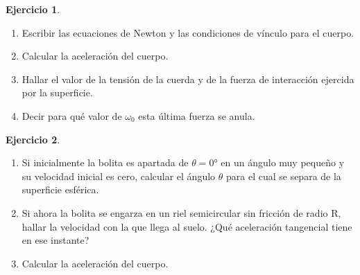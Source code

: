 \documentclass[a4paper,12pt,twoside]{book}
\newtheorem{ejercicio}{{Ejercicio}}[chapter]
\begin{document}
\begin{mdframed}[style=ejercicio-dificil]
    \begin{ejercicio}
    \end{ejercicio}
    \begin{center}
        \def\svgwidth{0.3\linewidth}
        
    \end{center}
    \begin{enumerate}
        \item Escribir las ecuaciones de Newton y las condiciones de vínculo para el cuerpo.
        \item Calcular la aceleración del cuerpo.
        \item Hallar el valor de la tensión de la cuerda y de la fuerza de interacción ejercida por la superficie.
        \item Decir para qué valor de $\omega_0$ esta última fuerza se anula.
    \end{enumerate}
\end{mdframed}

\begin{mdframed}[style=ejercicio-dificil]
    \begin{ejercicio}
    \end{ejercicio}
    \begin{center}
        \def\svgwidth{0.4\linewidth}
        
    \end{center}
    \begin{enumerate}
        \item Si inicialmente la bolita es apartada de $\theta = \ang{0}$ en un ángulo muy pequeño y su velocidad inicial es cero, calcular el ángulo $\theta$ para el cual se separa de la superficie esférica.
        \item Si ahora la bolita se engarza en un riel semicircular sin fricción de radio R, hallar la velocidad con la que llega al suelo. ¿Qué aceleración tangencial tiene en ese instante?
        \item Calcular la aceleración del cuerpo.
    \end{enumerate}
\end{mdframed}
\end{document}
